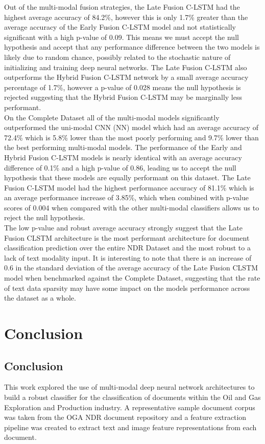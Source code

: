 \documentclass[a4paper,12pt]{article}
\begin{document}
Out of the multi-modal fusion strategies, the Late Fusion C-LSTM had the highest average accuracy of 84.2\%, however this is only 1.7\% greater than the average accuracy of the Early Fusion C-LSTM model and not statistically significant with a high p-value of 0.09. This means we must accept the null hypothesis and accept that any performance difference between the two models is likely due to random chance, possibly related to the stochastic nature of initializing and training deep neural networks. The Late Fusion C-LSTM also outperforms the Hybrid Fusion C-LSTM network by a small average accuracy percentage of 1.7\%, however  a p-value of 0.028 means the null hypothesis is rejected suggesting that the Hybrid Fusion C-LSTM may be marginally less performant.  \\

On the Complete Dataset all of the multi-modal models significantly outperformed the uni-modal CNN (NN) model which had an average accuracy of 72.4\% which is 5.8\% lower than the most poorly performing and 9.7\% lower than the best performing multi-modal models. The performance of the Early and Hybrid Fusion C-LSTM models is nearly identical with an average accuracy difference of 0.1\% and a high p-value of 0.86, leading us to accept the null hypothesis that these models are equally performant on this dataset. The Late Fusion C-LSTM model had the highest performance accuracy of 81.1\% which is an average performance increase of 3.85\%, which when combined with p-value scores of 0.004 when compared with the other multi-modal classifiers allows us to reject the null hypothesis.\\

The low p-value and robust average accuracy strongly suggest that the Late Fusion CLSTM architecture is the most performant architecture for document classification prediction over the entire NDR Dataset and the most robust to a lack of text modality input. It is interesting to note that there is an increase of 0.6 in the standard deviation of the average accuracy of the Late Fusion CLSTM model when benchmarked against the Complete Dataset, suggesting that the rate of text data sparsity may have some impact on the models performance across the dataset as a whole.  \\

\section{Conclusion}
\subsection{Conclusion}
This work explored the use of multi-modal deep neural network architectures to build a robust classifier for the classification of documents within the Oil and Gas Exploration and Production industry. A representative sample document corpus was taken from the OGA NDR document repository and a feature extraction pipeline was created to extract text and image feature representations from each document. \\
\end{document}
